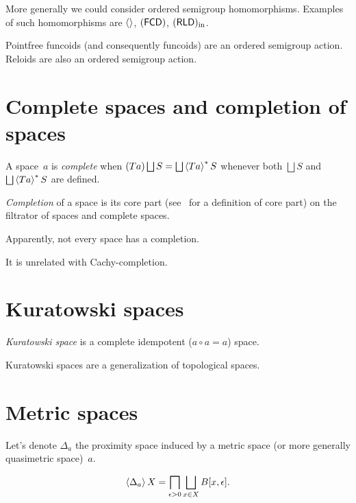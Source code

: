 More generally we could consider ordered semigroup homomorphisms. Examples of such homomorphisms are $\left\langle \right\rangle$, $(\mathsf{FCD})$, $(\mathsf{RLD})_{\mathrm{in}}$.

Pointfree funcoids (and consequently funcoids) are an ordered semigroup action. Reloids are also an ordered semigroup action.

\section{Complete spaces and completion of spaces}

A space~$a$ is \emph{complete} when $(Ta)\bigsqcup S=\bigsqcup\rsupfun{Ta}S$ whenever both $\bigsqcup S$ and $\bigsqcup\rsupfun{Ta}S$ are defined.

\begin{defn}
\emph{Completion} of a space is its core part (see~\cite{volume-1} for a definition of core part) on the filtrator of spaces and complete spaces.
\end{defn}

\begin{note}
Apparently, not every space has a completion.
\end{note}

\begin{note}
It is unrelated with Cachy-completion.
\end{note}

\section{Kuratowski spaces}

\begin{defn}
\emph{Kuratowski space} is a complete idempotent ($a\circ a=a$) space.
\end{defn}

Kuratowski spaces are a generalization of topological spaces.

\section{Metric spaces}

Let's denote $\Delta_a$ the proximity space induced by a metric space (or more generally quasimetric space)~$a$.

\begin{thm}
\[ \supfun{\Delta_a}X = \bigsqcap_{\epsilon>0}\bigsqcup_{x\in X}B[x,\epsilon]. \]
\end{thm}

